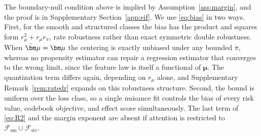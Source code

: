 \documentclass[11pt]{article}
\newcommand{\calF}{\mathcal F}
\newcommand{\bmu}{\bm\mu}
\begin{document}
The boundary-null condition above is implied by Assumption~\ref{ass:margin}, and the proof is in Supplementary Section~\ref{app:eif}. We use \eqref{eq:bias} in two ways. First, for the smooth and structured classes the bias has the product and squares form $r_\mu^2+r_\mu r_\pi$, rate robustness rather than exact symmetric double robustness. When $\bar\bmu=\bmu$ the centering is exactly unbiased under any bounded $\bar\pi$, whereas no propensity estimator can repair a regression estimator that converges to the wrong limit, since the feature law is itself a functional of $\bmu$. The quantization term differs again, depending on $r_\mu$ alone, and Supplementary Remark~\ref{rem:ratedr} expands on this robustness structure. Second, the bound is uniform over the loss class, so a single nuisance fit controls the bias of every risk value, codebook objective, and effect score simultaneously. The last term of \eqref{eq:R2} and the margin exponent are absent if attention is restricted to $\calF_{\mathrm{sm}}\cup\calF_{\mathrm{str}}$.
\end{document}
